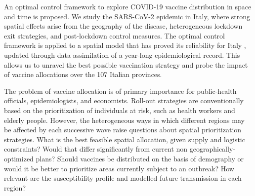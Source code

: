 An optimal control framework to explore COVID-19 vaccine distribution in space and time is proposed.
We study the SARS-CoV-2 epidemic in Italy, where strong spatial effects arise from the geography of the disease, heterogeneous lockdown exit strategies, and post-lockdown control measures\cite[-4.5\baselineskip]{Marziano:RetrospectiveAnalysisItalian:2021}. The optimal control framework is applied to a spatial model that has proved its reliability for Italy%
, updated through data assimilation of a year-long epidemiological record. This allows us to unravel the best possible vaccination strategy and probe the impact of vaccine allocations over the 107 Italian provinces.

The problem of vaccine allocation is of primary importance for  public-health officials, epidemiologists, and economists\cite[-7.5\baselineskip]{Emanuel:EthicalFrameworkGlobal:2020, Lipsitch:UnderstandingCOVID19Vaccine:2020}. 
Roll-out strategies are conventionally based on the prioritization of individuals at risk, such as health workers and elderly people\cite[-6.5\baselineskip]{Bubar:ModelinformedCOVID19Vaccine:2021,Fitzpatrick:OptimizingAgespecificVaccination:2021,Baden:EfficacySafetyMRNA1273:2020,Yang:WhoShouldBe:2021}. However, the heterogeneous ways in which different regions may be affected by each successive wave raise questions about spatial prioritization strategies. What is the best feasible spatial allocation, given supply and logistic constraints? Would that differ significantly from current non geographically-optimized plans? Should vaccines be distributed on the basis of demography or would it be better to prioritize areas currently subject to an outbreak? How relevant are the susceptibility profile and modelled future transmission in each region? 

